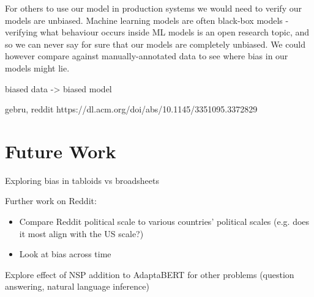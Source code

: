 For others to use our model in production systems we would need to verify our models are unbiased. Machine learning models are often black-box models - verifying what behaviour occurs inside ML models is an open research topic, and so we can never say for sure that our models are completely unbiased. We could however compare against manually-annotated data to see where bias in our models might lie.


biased data -> biased model

gebru, reddit
https://dl.acm.org/doi/abs/10.1145/3351095.3372829


\section{Future Work}

Exploring bias in tabloids vs broadsheets

Further work on Reddit:
\begin{itemize}
    \item Compare Reddit political scale to various countries' political scales (e.g. does it most align with the US scale?)
    \item Look at bias across time
\end{itemize}

Explore effect of NSP addition to AdaptaBERT for other problems (question answering, natural language inference)

